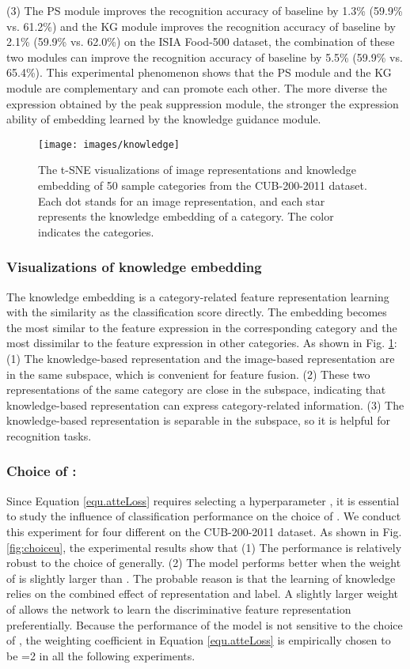 \documentclass[5p,twocolumn]{elsarticle}
\begin{document}
(3) The PS module improves the recognition accuracy of baseline by 1.3\% (59.9\% vs. 61.2\%) and the KG module improves the recognition accuracy of baseline by 2.1\% (59.9\% vs. 62.0\%) on the ISIA Food-500 dataset, the combination of these two modules can improve the recognition accuracy of baseline by 5.5\% (59.9\% vs. 65.4\%). This experimental phenomenon shows that the PS module and the KG module are complementary and can promote each other. The more diverse the expression obtained by the peak suppression module, the stronger the expression ability of embedding learned by the knowledge guidance module. 


\begin{figure}[h]
\centering
 \texttt{[image: images/knowledge]}
  \caption{The t-SNE visualizations of image representations and knowledge embedding of 50 sample categories from the CUB-200-2011 dataset. Each dot stands for an image representation, and each star represents the knowledge embedding of a category. The color indicates the categories.}
  \label{fig:knowledge}
\end{figure}


\subsubsection{\textbf{Visualizations of knowledge embedding}}
The knowledge embedding is a category-related feature representation learning with the similarity as the classification score directly. The embedding becomes the most similar to the feature expression in the corresponding category and the most dissimilar to the feature expression in other categories. As shown in Fig. \ref{fig:knowledge}: (1) The knowledge-based representation and the image-based representation are in the same subspace, which is convenient for feature fusion. (2) These two representations of the same category are close in the subspace, indicating that knowledge-based representation can express category-related information. (3) The knowledge-based representation is separable in the subspace, so it is helpful for recognition tasks.




\subsubsection{\textbf{Choice of :}}
Since Equation \ref{equ.atteLoss} requires selecting a hyperparameter , it is essential to study the influence of classification performance on the choice of . We conduct this experiment for four different  on the CUB-200-2011 dataset. As shown in Fig. \ref{fig:choiceu}, the experimental results show that (1) The performance is relatively robust to the choice of  generally. (2) The model performs better when the weight of  is slightly larger than . The probable reason is that the learning of knowledge relies on the combined effect of representation and label. A slightly larger weight of   allows the network to learn the discriminative feature representation preferentially. Because the performance of the model is not sensitive to the choice of , the weighting coefficient in Equation \ref{equ.atteLoss} is empirically chosen to be =2 in all the following experiments.
 
\end{document}

